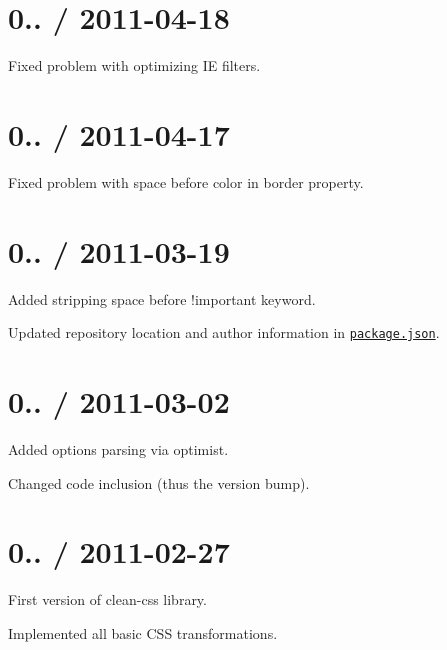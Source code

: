 \section*{0.. / 2011-\/04-\/18 }


\begin{DoxyItemize}
\item Fixed problem with optimizing IE filters.
\end{DoxyItemize}

\section*{0.. / 2011-\/04-\/17 }


\begin{DoxyItemize}
\item Fixed problem with space before color in {\ttfamily border} property.
\end{DoxyItemize}

\section*{0.. / 2011-\/03-\/19 }


\begin{DoxyItemize}
\item Added stripping space before {\ttfamily !important} keyword.
\item Updated repository location and author information in \href{/package.json}{\tt package.\+json}.
\end{DoxyItemize}

\section*{0.. / 2011-\/03-\/02 }


\begin{DoxyItemize}
\item Added options parsing via optimist.
\item Changed code inclusion (thus the version bump).
\end{DoxyItemize}

\section*{0.. / 2011-\/02-\/27 }


\begin{DoxyItemize}
\item First version of clean-\/css library.
\item Implemented all basic C\+SS transformations. 
\end{DoxyItemize}